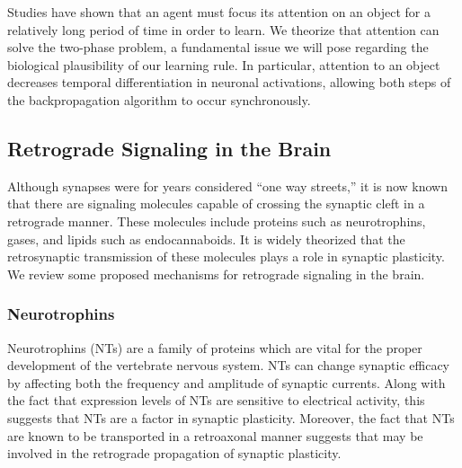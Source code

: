 \documentclass[12pt]{article}
\begin{document}
Studies have shown that an agent must focus its attention on an object for a relatively long period of time in order to learn. \cite{Desimone2014} We theorize that attention can solve the two-phase problem, a fundamental issue we will pose regarding the biological plausibility of our learning rule. In particular, attention to an object decreases temporal differentiation in neuronal activations, allowing both steps of the backpropagation algorithm to occur synchronously.

\subsection{Retrograde Signaling in the Brain}
Although synapses were for years considered ``one way streets,'' it is now known that there are signaling molecules capable of crossing the synaptic cleft in a retrograde manner. \cite{Tao2001} These molecules include proteins such as neurotrophins, \cite{Dechant2003} gases, \cite{RodriguezGrande2017} and lipids such as endocannaboids. \cite{Mechoulam1998} It is widely theorized that the retrosynaptic transmission of these molecules plays a role in synaptic plasticity. \cite{EAlger2002} \cite{Schuman1999} We review some proposed mechanisms for retrograde signaling in the brain.

\subsubsection{Neurotrophins}
Neurotrophins (NTs) are a family of proteins which are vital for the proper development of the vertebrate nervous system. \cite{Tao2001} NTs can change synaptic efficacy by affecting both the frequency and amplitude of synaptic currents. \cite{Levine1995} Along with the fact that expression levels of NTs are sensitive to electrical activity, this suggests that NTs are a factor in synaptic plasticity. Moreover, the fact that NTs are known to be transported in a retroaxonal manner \cite{Hendry1974} suggests that may be involved in the retrograde propagation of synaptic plasticity.
\end{document}
